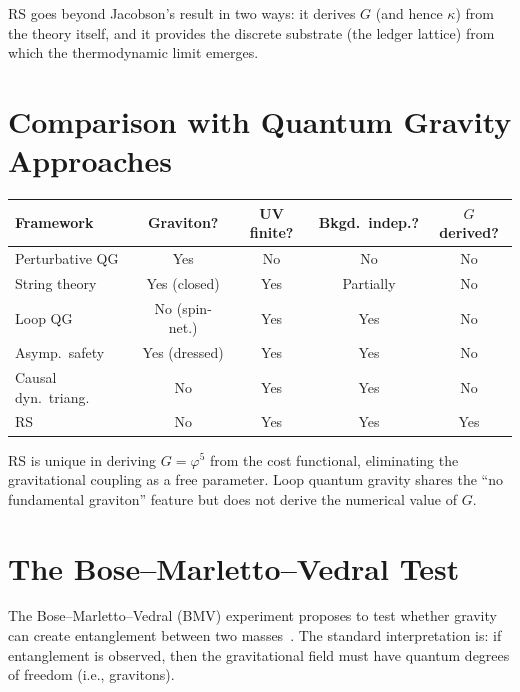 \documentclass[12pt,a4paper]{article}
\theoremstyle{definition}
\theoremstyle{remark}
\begin{document}
RS goes beyond Jacobson's result in two ways: it derives $G$
(and hence $\kappa$) from the theory itself, and it provides
the discrete substrate (the ledger lattice) from which the
thermodynamic limit emerges.

\section{Comparison with Quantum Gravity Approaches}
\label{sec:comparison}

\begin{center}
\small
\renewcommand{\arraystretch}{1.3}
\begin{tabular}{@{}lcccc@{}}
\toprule
\textbf{Framework} & \textbf{Graviton?} &
\textbf{UV finite?} & \textbf{Bkgd.\ indep.?} &
\textbf{$G$ derived?} \\
\midrule
Perturbative QG & Yes & No & No & No \\
String theory & Yes (closed) & Yes & Partially & No \\
Loop QG & No (spin-net.) & Yes & Yes & No \\
Asymp.\ safety & Yes (dressed) & Yes & Yes & No \\
Causal dyn.\ triang. & No & Yes & Yes & No \\
RS & No & Yes & Yes & Yes \\
\bottomrule
\end{tabular}
\end{center}

RS is unique in deriving $G = \varphi^5$ from the cost
functional, eliminating the gravitational coupling as a free
parameter.  Loop quantum gravity shares the ``no fundamental
graviton'' feature but does not derive the numerical value of
$G$.

\section{The Bose--Marletto--Vedral Test}
\label{sec:bmv}

The Bose--Marletto--Vedral (BMV) experiment
proposes to test whether gravity can create entanglement between
two masses~\cite{Bose2017, Marletto2017}.  The standard
interpretation is: if entanglement is observed, then the
gravitational field must have quantum degrees of freedom
(i.e., gravitons).
\end{document}
